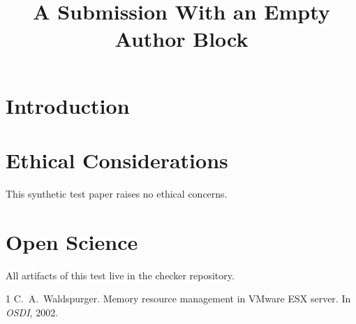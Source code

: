 \documentclass[letterpaper,twocolumn,10pt]{article}
\date{}
\title{\Large \bf A Submission With an Empty Author Block}
\author{}
\begin{document}
\maketitle

\begin{abstract}
\lipsum[1][1-5]
\end{abstract}

\section{Introduction}
\lipsum[2-4]

\appendix
\section*{Ethical Considerations}
This synthetic test paper raises no ethical concerns.

\section*{Open Science}
All artifacts of this test live in the checker repository.

\begin{thebibliography}{1}
 C.~A.\ Waldspurger. Memory resource management in VMware ESX
  server. In \emph{OSDI}, 2002.
\end{thebibliography}
\end{document}
